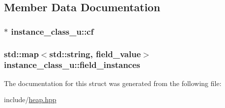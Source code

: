 \subsection{Member Data Documentation}
\hypertarget{structinstance__class__u_a0ff637ba668f3c4a4d144c3de64eb85b}{
\subsubsection[{cf}]{$\ast$ instance\+\_\+class\+\_\+u\+::cf}}\label{structinstance__class__u_a0ff637ba668f3c4a4d144c3de64eb85b}
\hypertarget{structinstance__class__u_af190ac0f8c491ac92da5c237cb7dfc26}{
\subsubsection[{field\+\_\+instances}]{\setlength{\rightskip}{0pt plus 5cm}std\+::map$<$std\+::string, {\bf field\+\_\+value}$>$ instance\+\_\+class\+\_\+u\+::field\+\_\+instances}}\label{structinstance__class__u_af190ac0f8c491ac92da5c237cb7dfc26}


The documentation for this struct was generated from the following file\+:\begin{DoxyCompactItemize}
\item 
include/\hyperlink{heap_8hpp}{heap.\+hpp}\end{DoxyCompactItemize}
